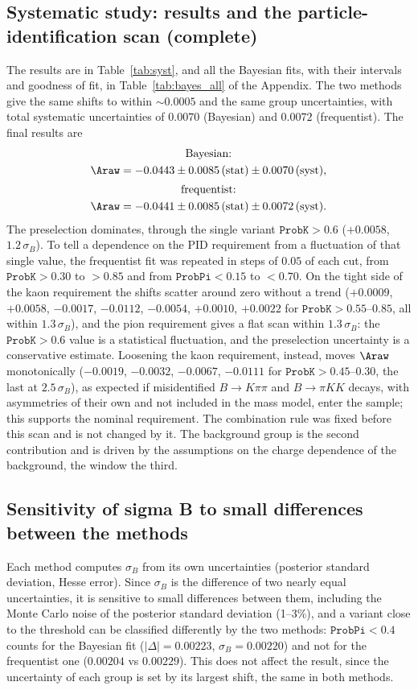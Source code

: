 \subsection{Systematic study: results and the particle-identification scan (complete)}
The results are in Table~\ref{tab:syst}, and all the Bayesian fits, with their intervals and goodness of fit, in Table~\ref{tab:bayes_all} of the Appendix. The two methods give the same shifts to within $\sim$$0.0005$ and the same group uncertainties, with total systematic uncertainties of $0.0070$ (Bayesian) and $0.0072$ (frequentist). The final results are
\begin{gather*}
\text{Bayesian:}\\ \Araw=-0.0443\pm0.0085\,(\text{stat})\pm0.0070\,(\text{syst}),\\[2pt]
\text{frequentist:}\\ \Araw=-0.0441\pm0.0085\,(\text{stat})\pm0.0072\,(\text{syst}).
\end{gather*}
The preselection dominates, through the single variant $\texttt{ProbK}>0.6$ ($+0.0058$, $1.2\,\sigma_B$). To tell a dependence on the PID requirement from a fluctuation of that single value, the frequentist fit was repeated in steps of $0.05$ of each cut, from $\texttt{ProbK}>0.30$ to $>0.85$ and from $\texttt{ProbPi}<0.15$ to $<0.70$. On the tight side of the kaon requirement the shifts scatter around zero without a trend ($+0.0009$, $+0.0058$, $-0.0017$, $-0.0112$, $-0.0054$, $+0.0010$, $+0.0022$ for $\texttt{ProbK}>0.55$--$0.85$, all within $1.3\,\sigma_B$), and the pion requirement gives a flat scan within $1.3\,\sigma_B$: the $\texttt{ProbK}>0.6$ value is a statistical fluctuation, and the preselection uncertainty is a conservative estimate. Loosening the kaon requirement, instead, moves $\Araw$ monotonically ($-0.0019$, $-0.0032$, $-0.0067$, $-0.0111$ for $\texttt{ProbK}>0.45$--$0.30$, the last at $2.5\,\sigma_B$), as expected if misidentified $B\to K\pi\pi$ and $B\to\pi KK$ decays, with asymmetries of their own and not included in the mass model, enter the sample; this supports the nominal requirement. The combination rule was fixed before this scan and is not changed by it. The background group is the second contribution and is driven by the assumptions on the charge dependence of the background, the window the third.

\subsection{Sensitivity of sigma B to small differences between the methods}
Each method computes $\sigma_B$ from its own uncertainties (posterior standard deviation, Hesse error). Since $\sigma_B$ is the difference of two nearly equal uncertainties, it is sensitive to small differences between them, including the Monte Carlo noise of the posterior standard deviation (1--3\%), and a variant close to the threshold can be classified differently by the two methods: $\texttt{ProbPi}<0.4$ counts for the Bayesian fit ($|\Delta|=0.00223$, $\sigma_B=0.00220$) and not for the frequentist one ($0.00204$ vs $0.00229$). This does not affect the result, since the uncertainty of each group is set by its largest shift, the same in both methods.

